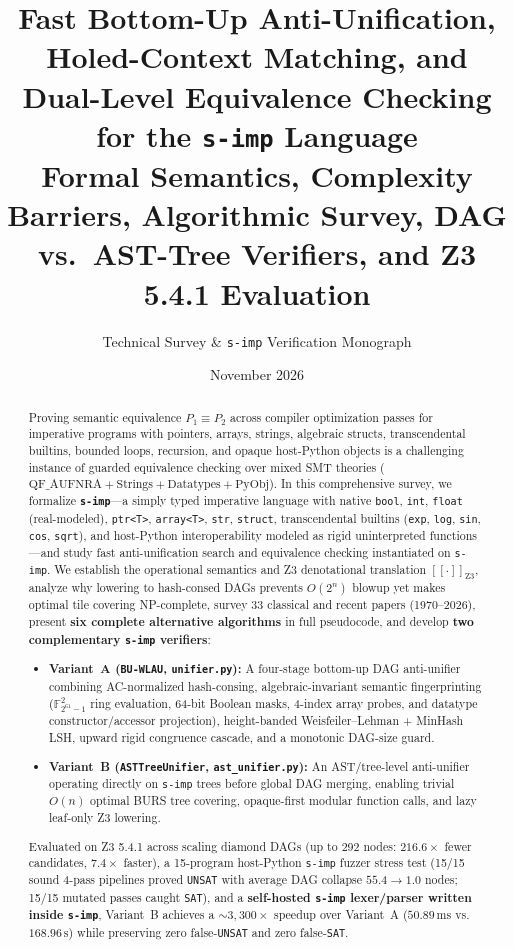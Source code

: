 \documentclass[11pt,a4paper]{article}
\title{\vspace{-0.5em}\textbf{\LARGE\color{primary}Fast Bottom-Up Anti-Unification, Holed-Context Matching, and Dual-Level Equivalence Checking for the \texttt{s-imp} Language}\\[0.5em]
\large\color{gray}Formal Semantics, Complexity Barriers, Algorithmic Survey, DAG vs.\ AST-Tree Verifiers, and Z3 5.4.1 Evaluation}
\author{Technical Survey \& \texttt{s-imp} Verification Monograph}
\date{November 2026}
\newcommand{\sem}[1]{[\![#1]\!]}
\begin{document}
\maketitle

\begin{abstract}
Proving semantic equivalence $P_1 \equiv P_2$ across compiler optimization passes for imperative programs with pointers, arrays, strings, algebraic structs, transcendental builtins, bounded loops, recursion, and opaque host-Python objects is a challenging instance of guarded equivalence checking over mixed SMT theories ($\text{QF\_AUFNRA} + \text{Strings} + \text{Datatypes} + \text{PyObj}$). In this comprehensive survey, we formalize \textbf{\texttt{s-imp}}---a simply typed imperative language with native \texttt{bool}, \texttt{int}, \texttt{float} (real-modeled), \texttt{ptr<T>}, \texttt{array<T>}, \texttt{str}, \texttt{struct}, transcendental builtins (\texttt{exp}, \texttt{log}, \texttt{sin}, \texttt{cos}, \texttt{sqrt}), and host-Python interoperability modeled as rigid uninterpreted functions---and study fast anti-unification search and equivalence checking instantiated on \texttt{s-imp}. We establish the operational semantics and Z3 denotational translation $\sem{\cdot}_{\text{Z3}}$, analyze why lowering to hash-consed DAGs prevents $O(2^n)$ blowup yet makes optimal tile covering NP-complete, survey 33 classical and recent papers (1970--2026), present \textbf{six complete alternative algorithms} in full pseudocode, and develop \textbf{two complementary \texttt{s-imp} verifiers}:
\begin{itemize}
  \item \textbf{Variant~A (\texttt{BU-WLAU}, \texttt{unifier.py}):} A four-stage bottom-up DAG anti-unifier combining AC-normalized hash-consing, algebraic-invariant semantic fingerprinting ($\mathbb{F}_{2^{61}-1}^2$ ring evaluation, 64-bit Boolean masks, 4-index array probes, and datatype constructor/accessor projection), height-banded Weisfeiler--Lehman + MinHash LSH, upward rigid congruence cascade, and a monotonic DAG-size guard.
  \item \textbf{Variant~B (\texttt{ASTTreeUnifier}, \texttt{ast\_unifier.py}):} An AST/tree-level anti-unifier operating directly on \texttt{s-imp} trees before global DAG merging, enabling trivial $O(n)$ optimal BURS tree covering, opaque-first modular function calls, and lazy leaf-only Z3 lowering.
\end{itemize}
Evaluated on Z3 5.4.1 across scaling diamond DAGs (up to 292 nodes: $216.6\times$ fewer candidates, $7.4\times$ faster), a 15-program host-Python \texttt{s-imp} fuzzer stress test (15/15 sound 4-pass pipelines proved \texttt{UNSAT} with average DAG collapse $55.4 \to 1.0$ nodes; 15/15 mutated passes caught \texttt{SAT}), and a \textbf{self-hosted \texttt{s-imp} lexer/parser written inside \texttt{s-imp}}, Variant~B achieves a $\sim 3{,}300\times$ speedup over Variant~A ($50.89\,\text{ms}$ vs.\ $168.96\,\text{s}$) while preserving zero false-\texttt{UNSAT} and zero false-\texttt{SAT}.
\end{abstract}
\end{document}
